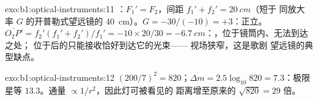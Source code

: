 \begin{solution}{exo:b1:optical-instruments:11}
：$F_1' = F_2$，间距 $f_1' + f_2' = \qty{20}{cm}$（短于
同放大率 $G$ 的开普勒式望远镜的 \qty{40}{cm}）。$G = -30/(-10) =
+3$：正立。 $\overline{O_2P'} = f_2'(f_1' + f_2')/f_1' =
-10 \times 20/30 = \qty{-6.7}{cm}$：，位于镜筒内、无法到达之处；
位于后的只能接收恰好到达它的光束——
视场狭窄，这是歌剧
望远镜的典型缺点。
\end{solution}

\begin{solution}{exo:b1:optical-instruments:12}
$(200/7)^2 = 820$；$\Delta m = 2.5\log_{10}820 = 7.3$：极限
星等 $13.3$。通量 $\propto 1/r^2$，因此灯可被看见的
距离增至原来的 $\sqrt{820} = 29$ 倍。
\end{solution}

